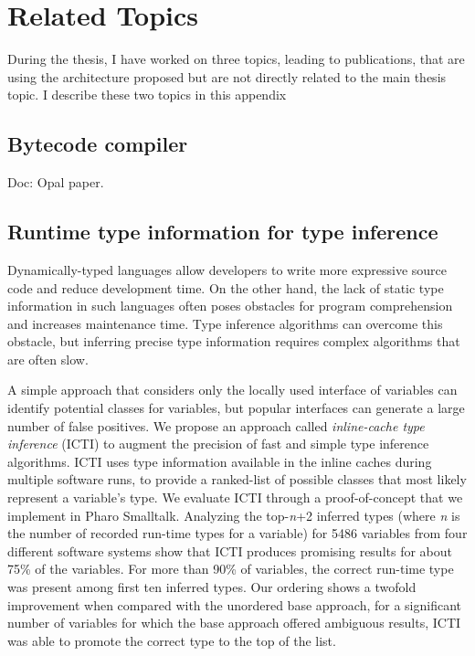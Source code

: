 \documentclass[a4paper,12pt,twoside]{../includes/ThesisStyle}
\begin{document}
\fi

\chapter{Related Topics}
\label{appendix:Other}
\minitoc

During the thesis, I have worked on three topics, leading to publications, that are using the architecture proposed but are not directly related to the main thesis topic. I describe these two topics in this appendix

\section{Bytecode compiler}

Doc: Opal paper.

\section{Runtime type information for type inference}

Dynamically-typed languages allow developers to write more expressive source code and reduce development time. On the other hand, the lack of static type information in such languages often poses obstacles for program comprehension and increases maintenance time. Type inference algorithms can overcome this obstacle, but inferring precise type information requires complex algorithms that are often slow.

A simple approach that considers only the locally used interface of variables can identify potential classes for variables, but popular interfaces can generate a large number of false positives. We propose an approach called \emph{inline-cache type inference} (ICTI) to augment the precision of fast and simple type inference algorithms. ICTI uses type information available in the inline caches during multiple software runs, to provide a ranked-list of possible classes that most likely represent a variable's type. We evaluate ICTI through a proof-of-concept that we implement in Pharo Smalltalk. Analyzing the top-\emph{n}+2 inferred types (where \emph{n} is the number of recorded run-time types for a variable) for 5486 variables from four different software systems show that ICTI produces promising results for about 75\% of the variables. For more than 90\% of variables, the correct run-time type was present among first ten inferred types. Our ordering shows a twofold improvement when compared with the unordered base approach, \ie for a significant number of variables for which the base approach offered ambiguous results, ICTI was able to promote the correct type to the top of the list.
\end{document}
